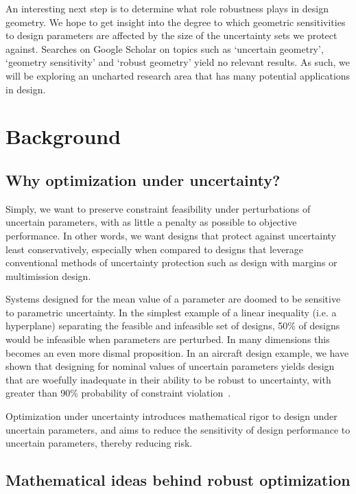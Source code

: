 \documentclass[journal]{new-aiaa}
\begin{document}
An interesting next step is to determine what role robustness plays in design geometry.
We hope to get insight into the degree to which
geometric sensitivities to design parameters are affected by the size of the uncertainty
sets we protect against. Searches on Google Scholar on topics such as `uncertain geometry',
`geometry sensitivity' and `robust geometry' yield no relevant results. As such, we
will be exploring an uncharted research area that has many potential applications in design.

\section{Background}

\subsection{Why optimization under uncertainty?}

Simply, we want to preserve constraint feasibility under perturbations of uncertain parameters,
with as little a penalty as possible to objective performance. In other words,
we want designs that protect against uncertainty least conservatively,
especially when compared to designs that leverage conventional methods
of uncertainty protection such as design with margins or multimission design.

Systems designed for the mean value of a parameter are doomed to be
sensitive to parametric uncertainty. In the simplest
example of a linear inequality (i.e. a hyperplane) separating the
feasible and infeasible set of designs, 50\% of designs would be
infeasible when parameters are perturbed.
In many dimensions this becomes an even more dismal proposition.
In an aircraft design example, we have shown that
designing for nominal values of uncertain parameters yields
design that are woefully inadequate in their ability to be robust
to uncertainty, with greater than 90\% probability of constraint
violation~\cite{Ozturk2019}.

Optimization under uncertainty introduces mathematical
rigor to design under uncertain parameters, and aims to
reduce the sensitivity of design performance to uncertain parameters, thereby reducing risk.

\subsection{Mathematical ideas behind robust optimization}
\end{document}
